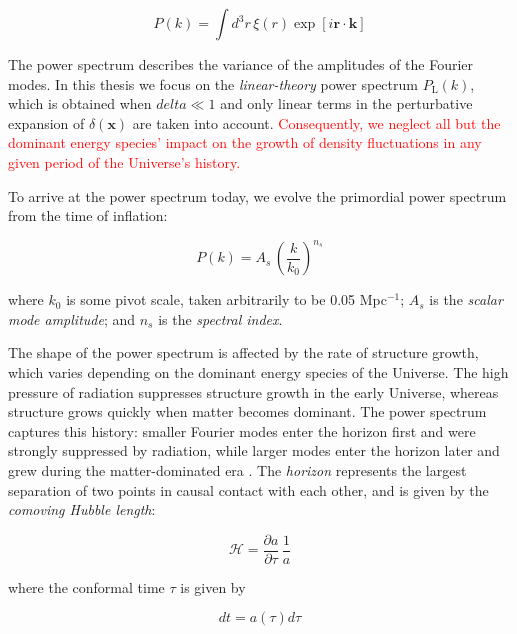 \begin{equation}
P(k) = \int d^3 r \, \xi(r) \exp [i \bm{r} \cdot \bm{k}]
\end{equation}


The power spectrum describes the variance of the amplitudes of the Fourier
modes. In this thesis we focus on the \textit{linear-theory} power spectrum 
$P_\text{L}(k)$, which is obtained when $delta \ll 1$ and only linear terms in 
the perturbative expansion of $\delta(\bm{x})$ are taken into account. 
\textcolor{red}{Consequently, we neglect all but the dominant energy species' 
impact on
the growth of density fluctuations in any given period of the Universe's
history.}

To arrive at the power spectrum today, we evolve the primordial power
spectrum from the time of inflation:

\begin{equation}
P(k) = A_s \, \left( \frac{k}{k_0} \right)^{n_s}
\end{equation}

where $k_0$ is some pivot scale, taken arbitrarily to be 0.05 Mpc$^{-1}$;
$A_s$ is the \textit{scalar mode amplitude}; and $n_s$ is the
\textit{spectral index}.

The shape of the power spectrum is affected by the rate of structure growth, 
which varies depending on the dominant energy species of the Universe.
The high pressure of radiation suppresses structure growth in the early
Universe, whereas structure grows quickly when matter becomes dominant.
The power spectrum captures this history: smaller Fourier modes enter the
horizon first and were strongly suppressed by radiation, while larger modes 
enter the horizon later and grew during the matter-dominated era
. The 
\textit{horizon} represents the largest separation of two points in causal 
contact with each other, and is given by the \textit{comoving Hubble length}:

\begin{equation}
\label{eq: horizon}
\mathcal{H}
=
\frac{\partial a}{\partial \tau} \, \frac{1}{a}
\end{equation}

where the conformal time $\tau$ is given by

\begin{equation}
dt = a(\tau) d \tau
\end{equation}

